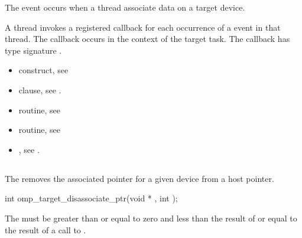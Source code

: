 \events
The  event occurs when a thread associate data on a target device.

\tools

A thread invokes a registered 
callback for each occurrence of a  event in that thread. 
The callback occurs in the context of the target task.  The callback has type signature
. 

\crossreferences
\begin{itemize}
\item {} construct, see 

\item {} clause, see .

\item {} routine, see 

\item {} routine, see 

\item {}, see 
.

\end{itemize}

\pagebreak
{}
\subsection{}
\label{subsec:omp_target_disassociate_ptr}
\summary

The  removes the associated pointer for a
given device from a host pointer.

\format
\begin{boxedcode}
int omp\_target\_disassociate\_ptr(void * , int );
\end{boxedcode}

\constraints


The 
must be greater than or equal to zero and less than the result of
 or equal to the result of a call to
.

